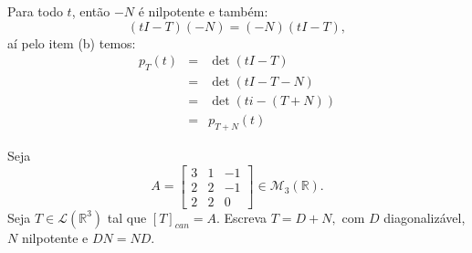 \documentclass[11pt,a4paper]{article}
\begin{document}
{\dividiritens{
\task[\pers{c}]
}
Para todo $t$, então $-N$ é nilpotente e também:
\[
(tI-T)(-N)=(-N)(tI-T),
\]
aí pelo item (b) temos:
\[
\begin{array}{rcl}
p_T(t) &=& \det(tI-T) \\
 &=& \det(tI-T-N) \\
&=& \det(ti-(T+N)) \\
&=& p_{T+N}(t)
\end{array}
\]
}

 Seja
\[
A = \begin{bmatrix}
3 & 1 & -1 \\
2 & 2 & -1 \\
2 & 2 & 0
\end{bmatrix} \in \mathcal{M}_3(\mathbb{R}).
\]
Seja $T \in \mathcal{L}(\mathbb{R}^3)$ tal que $[T]_{can} = A.$ Escreva $T = D + N,$ com $D$ diagonalizável, $N$ nilpotente e $DN = ND.$
\end{document}
